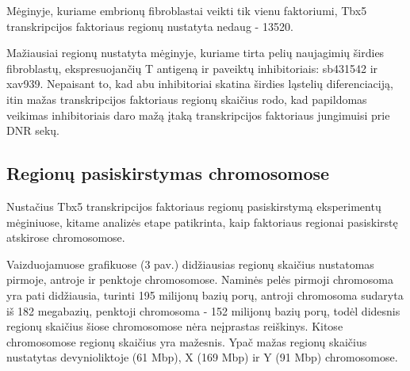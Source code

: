 \documentclass[12pt]{article}
\begin{document}
Mėginyje, kuriame embrionų fibroblastai veikti tik vienu faktoriumi,
Tbx5 transkripcijos faktoriaus regionų nustatyta nedaug -
13520.

Mažiausiai regionų nustatyta mėginyje, kuriame tirta pelių
naujagimių širdies fibroblastų, ekspresuojančių T antigeną
ir paveiktų inhibitoriais: sb431542 ir xav939.
Nepaisant to, kad abu inhibitoriai skatina širdies ląstelių
diferenciaciją\cite{HEART_CELL_DIFF_ARTCL}, itin mažas transkripcijos
faktoriaus regionų skaičius rodo, kad papildomas veikimas
inhibitoriais daro mažą įtaką transkripcijos faktoriaus
jungimuisi prie DNR sekų.

\newpage

\subsection{Regionų pasiskirstymas chromosomose}
Nustačius Tbx5 transkripcijos faktoriaus regionų
pasiskirstymą eksperimentų mėginiuose, kitame analizės etape
patikrinta, kaip faktoriaus regionai pasiskirstę atskirose
chromosomose.

Vaizduojamuose grafikuose (3 pav.) didžiausias regionų skaičius nustatomas
pirmoje, antroje ir penktoje chromosomose. Naminės pelės pirmoji
chromosoma yra pati didžiausia, turinti 195 milijonų bazių porų,
antroji chromosoma sudaryta iš 182 megabazių, penktoji chromosoma -
152 milijonų bazių porų, todėl didesnis regionų skaičius šiose
chromosomose nėra neįprastas reiškinys. Kitose chromosomose regionų
skaičius yra mažesnis. Ypač mažas regionų skaičius nustatytas
devynioliktoje (61 Mbp), X (169 Mbp) ir Y (91 Mbp) chromosomose.
\end{document}
